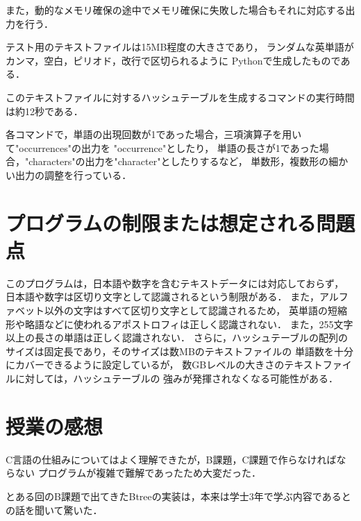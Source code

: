 \documentclass{jsarticle}
\begin{document}
また，動的なメモリ確保の途中でメモリ確保に失敗した場合もそれに対応する出力を行う．

テスト用のテキストファイルは15MB程度の大きさであり，
ランダムな英単語がカンマ，空白，ピリオド，改行で区切られるように
Pythonで生成したものである．

このテキストファイルに対するハッシュテーブルを生成するコマンドの実行時間は約12秒である．

各コマンドで，単語の出現回数が1であった場合，三項演算子を用いて"occurrences"の出力を
"occurrence"としたり，
単語の長さが1であった場合，"characters"の出力を"character"としたりするなど，
単数形，複数形の細かい出力の調整を行っている．

\section{プログラムの制限または想定される問題点}
このプログラムは，日本語や数字を含むテキストデータには対応しておらず，
日本語や数字は区切り文字として認識されるという制限がある．
また，アルファベット以外の文字はすべて区切り文字として認識されるため，
英単語の短縮形や略語などに使われるアポストロフィは正しく認識されない．
また，255文字以上の長さの単語は正しく認識されない．
さらに，ハッシュテーブルの配列のサイズは固定長であり，そのサイズは数MBのテキストファイルの
単語数を十分にカバーできるように設定しているが，
数GBレベルの大きさのテキストファイルに対しては，ハッシュテーブルの
強みが発揮されなくなる可能性がある．

\section{授業の感想}
C言語の仕組みについてはよく理解できたが，B課題，C課題で作らなければならない
プログラムが複雑で難解であったため大変だった．

とある回のB課題で出てきたBtreeの実装は，本来は学士3年で学ぶ内容であるとの話を聞いて驚いた．
\end{document}
